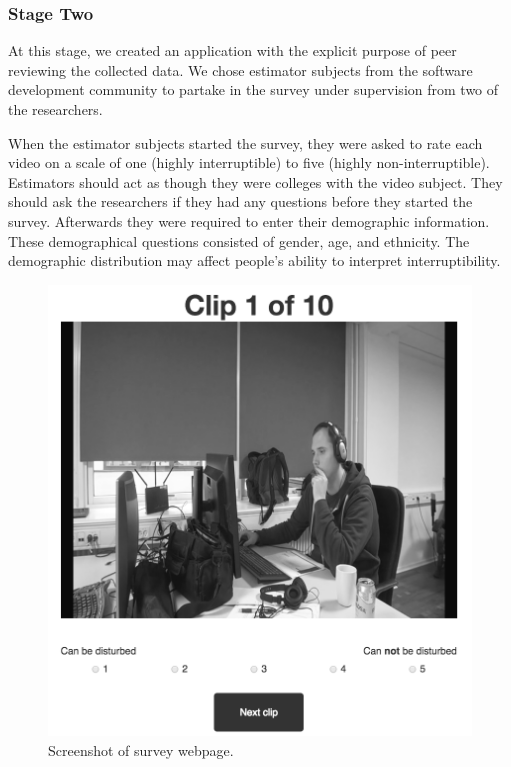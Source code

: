 \documentclass{sigchi}
\begin{document}
\subsubsection{Stage Two}
\label{stage_two}
At this stage, we created an application with the explicit purpose of peer reviewing the collected data.
We chose estimator subjects from the software development community to partake in the survey under supervision from two of the researchers.

When the estimator subjects started the survey, they were asked to rate each video on a scale of one (highly interruptible) to five (highly non-interruptible).
Estimators should act as though they were colleges with the video subject.
They should ask the researchers if they had any questions before they started the survey.
Afterwards they were required to enter their demographic information.
These demographical questions consisted of gender, age, and ethnicity.
The demographic distribution may affect people's ability to interpret interruptibility.

\begin{figure}
  \centering
  \includegraphics[width=\columnwidth]{figures/webpage_screenshot.png}
  \caption{Screenshot of survey webpage.}
  \label{fig:webpage}
\end{figure}
\end{document}
